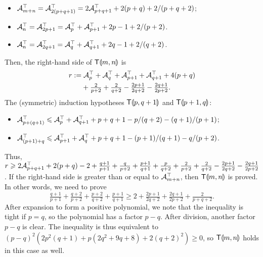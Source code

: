\begin{enumerate}
\begin{itemize}
      \item \(\mathcal{A}_{m+n}^{\top} = \mathcal{A}_{2(p+q+1)}^{\top} =
        2\mathcal{A}_{p+q+1}^{\top} + 2(p+q) + 2/(p+q+2)\);

      \item \(\mathcal{A}_{n}^{\top} = \mathcal{A}_{2p+1}^{\top} =
        \mathcal{A}_{p}^{\top} + \mathcal{A}_{p+1}^{\top} + 2p - 1 + 2/(p+2)\).

      \item \(\mathcal{A}_{n}^{\top} = \mathcal{A}_{2q+1}^{\top} =
        \mathcal{A}_{q}^{\top} + \mathcal{A}_{q+1}^{\top} + 2q - 1 + 2/(q+2)\).

    \end{itemize}
    Then, the right-hand side of \(\textsf{T}\llparenthesis{m,n}\rrparenthesis\) is
    \begin{align*}
      r &:= \mathcal{A}_{p}^{\top} + \mathcal{A}_{q}^{\top} + \mathcal{A}_{p+1}^{\top}
      + \mathcal{A}_{q+1}^{\top} + 4(p+q)\\
        &\phantom{:=} \; + \tfrac{2}{p+2} + \tfrac{2}{q+2}
      - \tfrac{2p+1}{2q+2} - \tfrac{2q+1}{2p+2}.
    \end{align*}
    The (symmetric) induction hypotheses \(\textsf{T}\llparenthesis{p,q+1}\rrparenthesis\) and
    \(\textsf{T}\llparenthesis{p+1,q}\rrparenthesis\):
    \begin{itemize}

      \item \(\mathcal{A}_{p+(q+1)}^{\top} \leqslant \mathcal{A}_{p}^{\top} +
        \mathcal{A}_{q+1}^{\top} + p + q + 1 - p/(q+2) - (q+1)/(p+1)\);

      \item \(\mathcal{A}_{(p+1)+q}^{\top} \leqslant \mathcal{A}_{p+1}^{\top} +
        \mathcal{A}_{q}^{\top} + p + q + 1 - (p+1)/(q+1) -
        q/(p+2)\).

    \end{itemize}
    Thus, \(r \geqslant 2\mathcal{A}_{p+q+1}^{\top} + 2(p+q) - 2 +
    \tfrac{q+1}{p+1} + \tfrac{q}{p+2} + \tfrac{p+1}{q+1} +
    \tfrac{p}{q+2} + \tfrac{2}{p+2} + \tfrac{2}{q+2} -
    \tfrac{2p+1}{2q+2} - \tfrac{2q+1}{2p+2}\). If the right-hand
    side is greater than or equal to \(\mathcal{A}_{m+n}^{\top}\), then
    \(\textsf{T}\llparenthesis{m,n}\rrparenthesis\) is proved. In other words, we need to prove
    \begin{equation*}
      \tfrac{q+1}{p+1} + \tfrac{q+2}{p+2} + \tfrac{p+2}{q+2} +
      \tfrac{p+1}{q+1} \geqslant 2 + \tfrac{2p+1}{2q+2} +        
      \tfrac{2q+1}{2p+2} + \tfrac{2}{p+q+2}.
    \end{equation*}
    After expansion to form a positive polynomial, we note that the
    inequality is tight if \(p=q\), so the polynomial has a factor
    \(p-q\). After division, another factor \(p-q\) is clear. The
    inequality is thus equivalent to \((p-q)^2(2p^2(q+1) + p(2q^2 + 9q
    + 8) + 2(q+2)^2) \geqslant 0\), so \(\textsf{T}\llparenthesis{m,n}\rrparenthesis\) holds in this
    case as well.

\end{enumerate}
